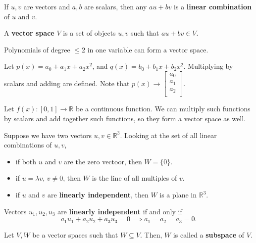 \begin{definition}
	If \( u,v \) are vectors and \( a,b \) are scalars, then any \( au+bv \) is a \textbf{linear combination} of \( u \) and \( v \).
\end{definition}

\begin{remark}
	A \textbf{vector space} \( V \) is a set of objects \( u,v \) such that \( au+bv \in V\).
\end{remark}

\begin{eg}
	Polynomials of degree \( \le 2 \) in one variable can form a vector space.
\end{eg}
\begin{explanation}
	Let \( p(x) = a_{0}+a_{1}x+a_{2}x^2 \), and \( q(x) = b_{0}+b_{1}x+b_{2}x^2  \). Multiplying by scalars and adding are defined. Note that \( p(x) \to \begin{bmatrix}
		a_{0}\\
		a_{1}\\
		a_{2}\\
	\end{bmatrix} \).
\end{explanation}

\begin{eg}
	Let \( f(x) : [0,1] \to \mathbb{R} \) be a continuous function. We can multiply such functions by scalars and add together such functions, so they form a vector space as well.
\end{eg}

Suppose we have two vectors \( u, v \in \mathbb{R}^3\). Looking at the set of all linear combinations of \( u,v \),
\begin{itemize}
	\item if both \( u \) and \( v \) are the zero vectoor, then \( W=\{0\}   \).
	\item if \( u = \lambda v \), \( v\neq 0 \), then \( W \) is the line of all multiples of \( v \).
	\item if \( u \) and \( v \) are \textbf{linearly independent}, then \( W \) is a plane in \( \mathbb{R}^3 \).
\end{itemize}

\begin{definition}
	Vectors \( u_{1},u_{2},u_{3} \) are \textbf{linearly independent} if and only if \[
		a_{1}u_{1} + a_{2}u_{2} + a_{3}u_{3} = 0 \implies a_{1}=a_{2}=a_{3}=0
	.\] 
\end{definition}

\begin{definition}
  Let \( V,W \) be a vector spaces such that \( W \subseteq V \). Then, \( W \) is called a \textbf{subspace} of \( V \).
\end{definition}

